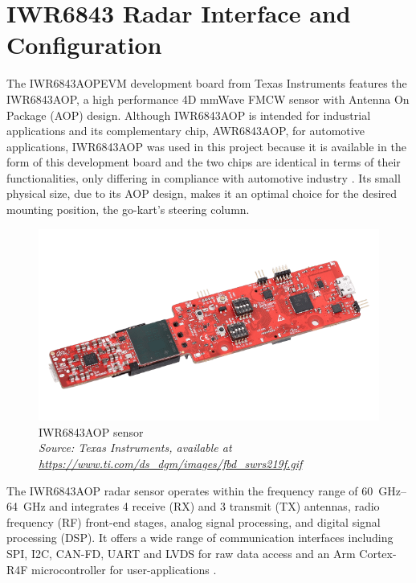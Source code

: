 \section{IWR6843 Radar Interface and Configuration}
\label{sec:IWR6843 Radar Interface and Configuration}
The IWR6843AOPEVM development board from Texas Instruments features the IWR6843AOP, a high performance 4D mmWave FMCW sensor with Antenna On Package (AOP) design.
Although IWR6843AOP is intended for industrial applications and its complementary chip, AWR6843AOP, for automotive applications, IWR6843AOP was used in this project because it is available in the form of this development board and the two chips are identical in terms of their functionalities, only differing in compliance with automotive  industry \cite{iwr_awr_diff}.
Its small physical size, due to its AOP design, makes it an optimal choice for the desired mounting position, the go-kart's steering column.
\begin{figure}[!htbp]
    \centering
    \includegraphics[width=0.7\linewidth]{images/iwr6843aopevm-angled.png}
    \caption{IWR6843AOP sensor\\
    \textit{Source: Texas Instruments, available at \url{https://www.ti.com/ds_dgm/images/fbd_swrs219f.gif}}}
    \label{fig:IWR6843AOP sensor}
\end{figure}
\par
The IWR6843AOP radar sensor operates within the frequency range of \SIrange{60}{64}{\giga\hertz} and integrates 4 receive (RX) and 3 transmit (TX) antennas, radio frequency (RF) front-end stages, analog signal processing, and digital signal processing (DSP).
It offers a wide range of communication interfaces including SPI, I2C, CAN-FD, UART and LVDS for raw data access and an Arm Cortex-R4F microcontroller for user-applications \cite{dev_board_page}.

